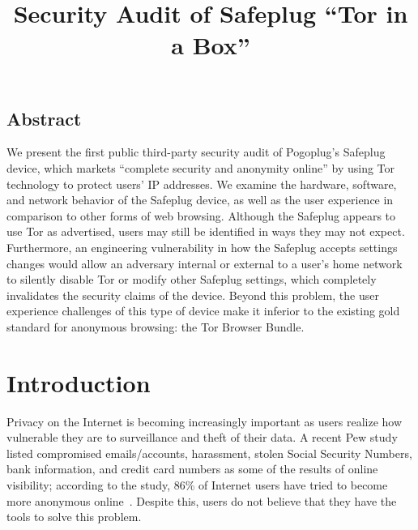 \documentclass[letterpaper,twocolumn,10pt]{article}
\begin{document}
\date{}

\title{\Large \bf Security Audit of Safeplug ``Tor in a Box''}

\maketitle


\subsection*{Abstract}
We present the first public third-party security audit of Pogoplug's Safeplug device, which markets ``complete security and anonymity online'' by using Tor technology to protect users' IP addresses.  We examine the hardware, software, and network behavior of the Safeplug device, as well as the user experience in comparison to other forms of web browsing.  Although the Safeplug appears to use Tor as advertised, users may still be identified in ways they may not expect.  Furthermore, an engineering vulnerability in how the Safeplug accepts settings changes would allow an adversary internal or external to a user's home network to silently disable Tor or modify other Safeplug settings, which completely invalidates the security claims of the device.  Beyond this problem, the user experience challenges of this type of device make it inferior to the existing gold standard for anonymous browsing: the Tor Browser Bundle.


\section{Introduction}
Privacy on the Internet is becoming increasingly important as users realize how vulnerable they are to surveillance and theft of their data.  A recent Pew study listed compromised emails/accounts, harassment, stolen Social Security Numbers, bank information, and credit card numbers as some of the results of online visibility; according to the study, 86\% of Internet users have tried to become more anonymous online~\cite{pew}.  Despite this, users do not believe that they have the tools to solve this problem.
\end{document}
